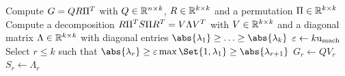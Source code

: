 \begin{algorithm}[t]
  \caption[Column Compression for Low-Rank Symmetric Indefinite Factorizations]{%
    Column Compression for \acp{LRSIF}
  }
  \label{alg:lowrank:compression}
  Compute $G=QR\Pi^T$ with $Q\in\mathbb{R}^{n\times k}$, $R\in\mathbb{R}^{k\times k}$ and a permutation $\Pi\in\mathbb{R}^{k\times k}$\;
  Compute a decomposition $R \Pi^T S \Pi R^T = V \Lambda V^T$ with $V \in \mathbb{R}^{k\times k}$
  and a diagonal matrix $\Lambda\in\mathbb{R}^{k\times k}$ with diagonal entries $\abs{\lambda_1}\geq\ldots\geq\abs{\lambda_k}$\;
  $\varepsilon \gets k \mathrm u_\text{mach}$\;
  Select $r \leq k$ such that $\abs{\lambda_r} \geq \epsilon\max\Set{1, \lambda_1} \geq \abs{\lambda_{r+1}}$\;
  $G_r \gets Q V_r$\;
  $S_r \gets \Lambda_r$\;
\end{algorithm}

